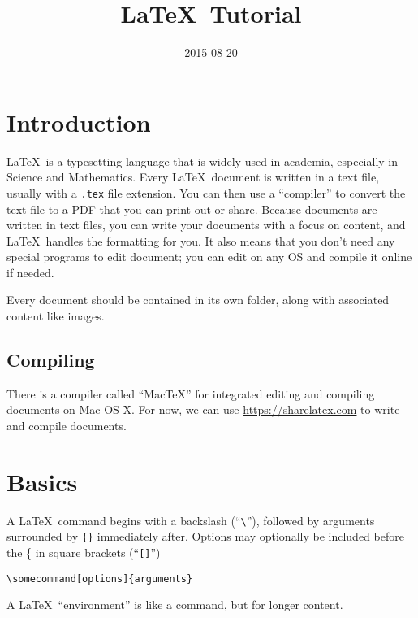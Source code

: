 \documentclass{chan}
\title{\LaTeX\ Tutorial}
\date{2015-08-20}
\subtitle{}
\begin{document}


\section{Introduction}

\LaTeX\ is a typesetting language that is widely used in academia, especially in Science and Mathematics.
Every \LaTeX\ document is written in a text file, usually with a \texttt{.tex} file extension.
You can then use a ``compiler'' to convert the text file to a PDF that you can print out or share.
Because documents are written in text files, you can write your documents with a focus on content, and \LaTeX\ handles the formatting for you.
It also means that you don't need any special programs to edit document; you can edit on any OS and compile it online if needed.

Every document should be contained in its own folder, along with associated content like images.

\subsection{Compiling}

There is a compiler called ``MacTeX'' for integrated editing and compiling documents on Mac OS X.
For now, we can use \url{https://sharelatex.com} to write and compile documents.

\section{Basics}

A \LaTeX\ command begins with a backslash (``\verb$\$''), followed by arguments surrounded by \verb${}$ immediately after.
Options may optionally be included before the \{ in square brackets (``\verb$[]$'')

\begin{lstlisting}
\somecommand[options]{arguments}
\end{lstlisting}

A \LaTeX\ ``environment'' is like a command, but for longer content.
\end{document}
